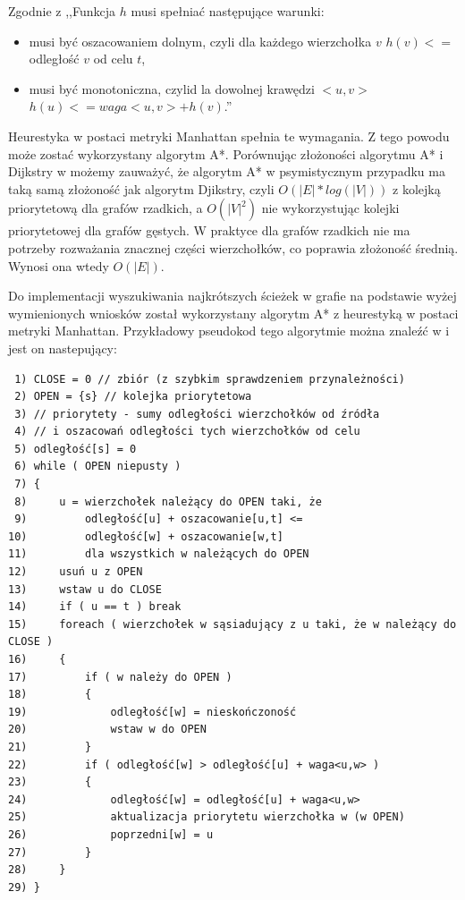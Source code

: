\documentclass[a4paper,11pt,twoside]{report}
\theoremstyle{definition}
\begin{document}
Zgodnie z \cite{AiSD2} ,,Funkcja $h$ musi spełniać następujące warunki:

\begin{itemize}[noitemsep]
\item musi być oszacowaniem dolnym, czyli dla każdego wierzchołka $v$ $h(v) <=$ odległość $v$ od celu $t$,
\item musi być monotoniczna, czylid la dowolnej krawędzi $<u,v>$ $h(u) <= waga<u,v> + h(v)$.''
\end{itemize} 

Heurestyka w postaci metryki Manhattan spełnia te wymagania. Z tego powodu może zostać wykorzystany algorytm A*. Porównując złożoności algorytmu A* i Dijkstry w \cite{AiSD2} możemy zauważyć, że algorytm A* w psymistycznym przypadku ma taką samą złożoność jak algorytm Djikstry, czyli $O(|E|*log(|V|))$ z kolejką priorytetową dla grafów rzadkich, a $O(|V|^2)$ nie wykorzystując kolejki priorytetowej dla grafów gęstych. W praktyce dla grafów rzadkich nie ma potrzeby rozważania znacznej części wierzchołków, co poprawia złożoność średnią. Wynosi ona wtedy $O(|E|)$.

Do implementacji wyszukiwania najkrótszych ścieżek w grafie na podstawie wyżej wymienionych wniosków został wykorzystany algorytm A* z heurestyką w postaci metryki Manhattan. Przykładowy pseudokod tego algorytmie można znaleźć w \cite{AiSD2} i jest on nastepujący: %

\begin{verbatim}
 1) CLOSE = 0 // zbiór (z szybkim sprawdzeniem przynależności)
 2) OPEN = {s} // kolejka priorytetowa
 3) // priorytety - sumy odległości wierzchołków od źródła
 4) // i oszacowań odległości tych wierzchołków od celu
 5) odległość[s] = 0
 6) while ( OPEN niepusty )
 7) {
 8)     u = wierzchołek należący do OPEN taki, że
 9)         odległość[u] + oszacowanie[u,t] <=
10)         odległość[w] + oszacowanie[w,t]
11)         dla wszystkich w należących do OPEN
12)     usuń u z OPEN
13)     wstaw u do CLOSE
14)     if ( u == t ) break
15)     foreach ( wierzchołek w sąsiadujący z u taki, że w należący do CLOSE )
16)     {
17)         if ( w należy do OPEN )
18)         {
19)             odległość[w] = nieskończoność
20)             wstaw w do OPEN
21)         }
22)         if ( odległość[w] > odległość[u] + waga<u,w> )
23)         {
24)             odległość[w] = odległość[u] + waga<u,w>
25)             aktualizacja priorytetu wierzchołka w (w OPEN)
26)             poprzedni[w] = u
27)         }
28)     }
29) }
\end{verbatim}
\end{document}
